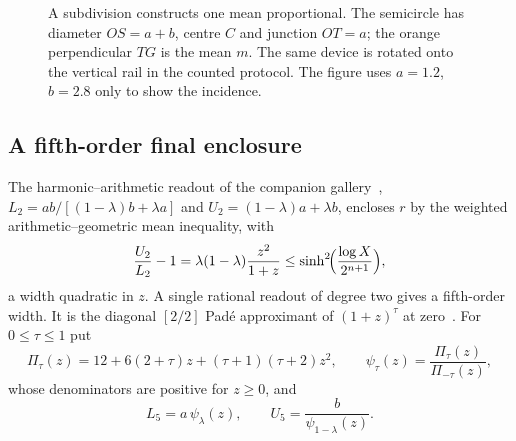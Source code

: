 \begin{figure}[h]
\centering\figSubdivision
\caption{A subdivision constructs one mean proportional. The semicircle has diameter $OS=a+b$, centre
$C$ and junction $OT=a$; the orange perpendicular $TG$ is the mean $m$. The same device is rotated onto the vertical rail in the counted protocol.
The figure uses $a=1.2$, $b=2.8$ only to show the incidence.}\label{fig:subdiv}
\end{figure}

\subsection{A fifth-order final enclosure}

The harmonic--arithmetic readout of the companion gallery~\cite{gallery},
$L_2=ab/[(1-\lambda)b+\lambda a]$ and $U_2=(1-\lambda)a+\lambda b$, encloses $r$ by the weighted
arithmetic--geometric mean inequality, with
\[ \frac{U_2}{L_2}-1=\lambda(1-\lambda)\frac{z^{2}}{1+z}\le\sinh^{2}\!\Bigl(\frac{\log X}{2^{n+1}}\Bigr), \]
a width quadratic in $z$. A single rational readout of degree two gives a fifth-order width. It is the
diagonal $[2/2]$ Pad\'e approximant of $(1+z)^{\tau}$ at zero~\cite{dlmf,baker}. For $0\le\tau\le1$ put
\begin{equation}\label{eq:pade}
\Pi_\tau(z)=12+6(2+\tau)z+(\tau+1)(\tau+2)z^{2},\qquad
\psi_\tau(z)=\frac{\Pi_\tau(z)}{\Pi_{-\tau}(z)},
\end{equation}
whose denominators are positive for $z\ge0$, and
\begin{equation}\label{eq:L5}
L_5=a\,\psi_\lambda(z),\qquad U_5=\frac{b}{\psi_{1-\lambda}(z)}.
\end{equation}

